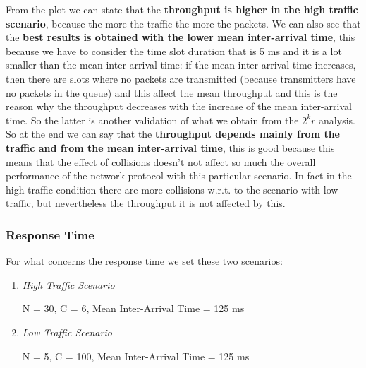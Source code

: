 \noindent From the plot we can state that the \textbf{throughput is higher in the high traffic scenario}, because the more the traffic the more the packets. We can also see that the \textbf{best results is obtained with the lower mean inter-arrival time}, this because we have to consider the time slot duration that is 5 ms and it is a lot smaller than the mean inter-arrival time: if the mean inter-arrival time increases, then there are slots where no packets are transmitted (because transmitters have no packets in the queue) and this affect the mean throughput and this is the reason why the throughput decreases with the increase of the mean inter-arrival time. So the latter is another validation of what we obtain from the $2^kr$ analysis. So at the end we can say that the \textbf{throughput depends mainly from the traffic and from the mean inter-arrival time}, this is good because this means that the effect of collisions doesn't not affect so much the overall performance of the network protocol with this particular scenario. In fact in the high traffic condition there are more collisions w.r.t. to the scenario with low traffic, but nevertheless the throughput it is not affected by this.




\subsubsection{Response Time}
For what concerns the response time we set these two scenarios:
\begin{enumerate}
	\item \textit{High Traffic Scenario}
	
	N = 30, C = 6, Mean Inter-Arrival Time = 125 ms
	\item \textit{Low Traffic Scenario}
	
	N = 5, C = 100, Mean Inter-Arrival Time = 125 ms
\end{enumerate}

